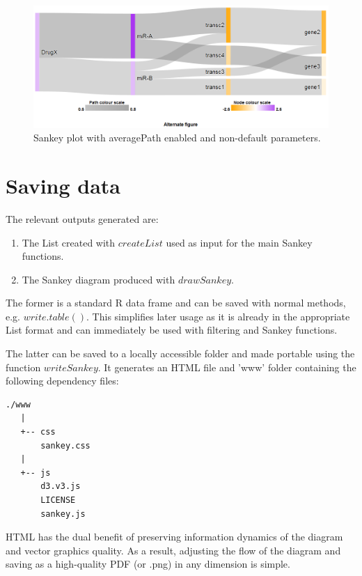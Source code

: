 \documentclass[a4paper]{article}
\begin{document}
\begin{figure}[htbp]
    \begin{center}
    \includegraphics[width=\textwidth]{figure3.png}
    \caption{Sankey plot with averagePath enabled and non-default parameters.}
    \label{fig:Custom}
    \end{center}
\end{figure}

\section{Saving data}
The relevant outputs generated are:
\begin{enumerate}
    \item The List created with $createList$ used as input for the main Sankey functions.
    \item The Sankey diagram produced with $drawSankey$.
\end{enumerate}
The former is a standard R data frame and can be saved with normal methods, e.g. $write.table()$. This simplifies later usage as it is already in the appropriate List format and can immediately be used with filtering and Sankey functions.

The latter can be saved to a locally accessible folder and made portable using the function $writeSankey$. It generates an HTML file and 'www' folder containing the following dependency files:
\begin{verbatim}
./www
   |
   +-- css
       sankey.css
   |
   +-- js
       d3.v3.js
       LICENSE
       sankey.js
\end{verbatim}
HTML has the dual benefit of preserving information dynamics of the diagram and vector graphics quality. As a result, adjusting the flow of the diagram and saving as a high-quality PDF (or .png) in any dimension is simple.
\end{document}

